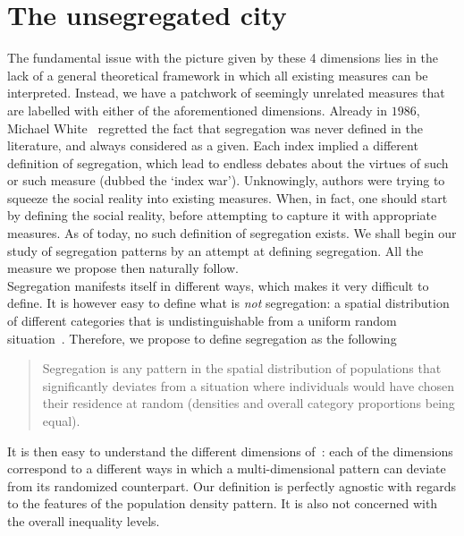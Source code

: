 \section{The unsegregated city}
\label{sec:null_model_the_unsegregated_city}

The fundamental issue with the picture given by these 4 dimensions lies in the
lack of a general theoretical framework in which all existing measures can be
interpreted.  Instead, we have a patchwork of seemingly unrelated measures that
are labelled with either of the aforementioned dimensions. Already in $1986$,
Michael White~\cite{White:1986} regretted the fact that segregation was never
defined in the literature, and always considered as a given. Each index implied a different definition of segregation, which lead to endless
debates about the virtues of such or such measure (dubbed the `index war').
Unknowingly, authors were trying to squeeze the social reality into existing
measures. When, in fact, one should start by defining the social reality, before
attempting to capture it with appropriate measures. As of today, no such
definition of segregation exists. We shall begin our study of segregation
patterns by an attempt at defining segregation. All the measure we propose then
naturally follow.\\

Segregation manifests itself in different ways, which makes it very difficult to
define. It is however easy to define what is \emph{not} segregation: a spatial
distribution of different categories that is undistinguishable from a uniform
random situation~\cite{Jahn:1947}. Therefore, we propose to define segregation
as the following

\begin{quote}
Segregation is any pattern in the spatial distribution of populations that
significantly deviates from a situation where individuals would have chosen
their residence at random (densities and overall category proportions being
equal).  
\end{quote} 

It is then easy to understand the different dimensions
of~\cite{Massey:1988,Reardon:2004}: each of the dimensions correspond to a
different ways in which a multi-dimensional pattern can deviate from its
randomized counterpart. Our definition is perfectly agnostic with regards to
the features of the population density pattern. It is also not concerned with
the overall inequality levels.\\

